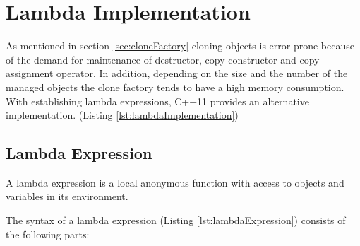 {\FloatBarrier

\section{Lambda Implementation}\label{sec:lambdaFactory}
\noindent As mentioned in section \ref{sec:cloneFactory} cloning objects is error-prone because of the demand for maintenance of destructor, copy constructor and copy assignment operator. In addition, depending on the size and the number of the managed objects the clone factory tends to have a high memory consumption. With establishing lambda expressions, C++11 provides an alternative implementation. (Listing \ref{lst:lambdaImplementation})

 

\subsection{Lambda Expression}\label{sec:LambdaExpression}
\noindent A lambda expression is a local anonymous function with access to objects and variables in its environment. \cite[cf.][914 - 915]{Kirch2015}

 

\noindent The syntax of a lambda expression (Listing \ref{lst:lambdaExpression}) consists of the following parts:


}
